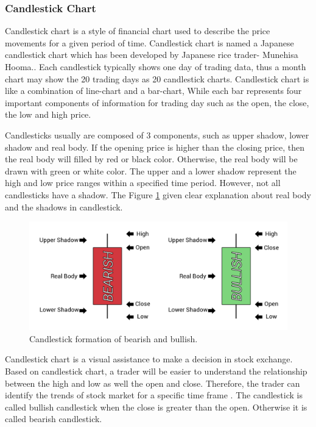 \documentclass[10pt,twocolumn]{article}
\begin{document}
\subsubsection{Candlestick Chart}
Candlestick chart is a style of financial chart used to describe the price movements for a given period of time. Candlestick chart is named a Japanese candlestick chart which has been developed by Japanese rice trader- Munehisa Hooma.\cite{morris2006candlestick}. Each candlestick typically shows one day of trading data, thus a month chart may show the 20 trading days as 20 candlestick charts. Candlestick chart is like a combination of line-chart and a bar-chart, While each bar represents four important components of information for trading day such as the open, the close, the low and high price.
\par
Candlesticks usually are composed of 3 components, such as upper shadow, lower shadow and real body. If the opening price is higher than the closing price, then the real body will filled by red or black color. Otherwise, the real body will be drawn with green or white color. The upper and a lower shadow represent the high and low price ranges within a specified time period. However, not all candlesticks have a shadow. The Figure \ref{fig:candlestickformation} given clear explanation about real body and the shadows in candlestick.
\begin{figure}
  \includegraphics[width=\linewidth]{figures/candlestick_formation.png}
  \caption{Candlestick formation of bearish and bullish.}
  \label{fig:candlestickformation}
\end{figure}
\par
Candlestick chart is a visual assistance to make a decision in stock exchange. Based on candlestick chart, a trader will be easier to understand the relationship between the high and low as well the open and close. Therefore, the trader can identify the trends of stock market for a specific time frame \cite{lu2012profitable}. The candlestick is called bullish candlestick when the close is greater than the open. Otherwise it is called bearish candlestick.
\end{document}
